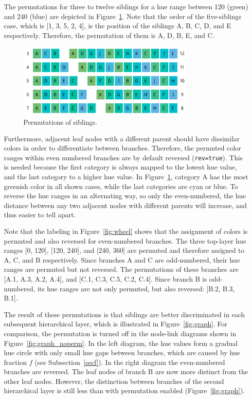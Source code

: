\documentclass[review,journal]{vgtc}         %
\begin{document}
The permutations for three to twelve siblings for a hue range between 120 (green) and 240 (blue) are depicted in Figure~\ref{fig:perm}. Note that the order of the five-siblings case, which is [1, 3, 5, 2, 4], is the position of the siblings A, B, C, D, and E respectively. Therefore, the permutation of them is A, D, B, E, and C. 

\begin{figure}[tb]
  \centering
  \includegraphics[width=3.5in]{Permutations.pdf}
  \caption{Permutations of siblings.}\label{fig:perm}
\end{figure}

Furthermore, adjacent leaf nodes with a different parent should have dissimilar colors in order to differentiate between branches. Therefore, the permuted color ranges within even numbered branches are by default reversed (\texttt{rev=true}). This is needed because the first category is always mapped to the lowest hue value, and the last category to a higher hue value. In Figure~\ref{fig:perm}, category A has the most greenish color in all shown cases, while the last categories are cyan or blue. To reverse the hue ranges in an alternating way, so only the even-numbered, the hue distance between any two adjacent nodes with different parents will increase, and thus easier to tell apart. 

Note that the labeling in Figure~\ref{fig:wheel} shows that the assignment of colors is permuted and also reversed for even-numbered branches. The three top-layer hue ranges [0, 120], [120, 240], and [240, 360] are permuted and therefore assigned to A, C, and B respectively. Since branches A and C are odd-numbered, their hue ranges are permuted but not reversed. The permutations of these branches are [A.1, A.3, A.2, A.4], and [C.1, C.3, C.5, C.2, C.4]. Since branch B is odd-numbered, its hue ranges are not only permuted, but also reversed: [B.2, B.3, B.1].

The result of these permutations is that siblings are better discriminated in each subsequent 
hierarchical layer, which is illustrated in Figure~\ref{fig:graph}. For comparison, the permutation 
is turned off in the node-link diagrams shown in Figure~\ref{fig:graph_noperm}. In the left diagram, the hue values 
form a gradual hue circle with only small hue gaps between branches, which are caused by hue fraction $f$ (see Subsection~\ref{secf}). In the right diagram the even-numbered branches are reversed. The leaf nodes of branch B are now more distinct from the other leaf nodes. However, the distinction between branches of the second hierarchical layer is still less than with permutation enabled (Figure~\ref{fig:graph}).
\end{document}
